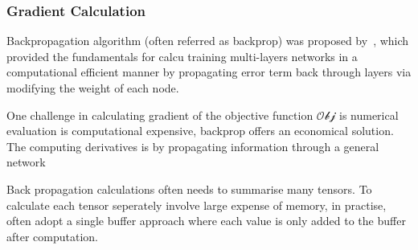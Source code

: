 \subsubsection{Gradient Calculation}
Backpropagation algorithm (often referred as backprop) was proposed by~\citet{werbos1975beyond}, which provided the fundamentals for calcu training multi-layers networks in a computational efficient manner by propagating error term back through layers via modifying the weight of each node. 
\par
One challenge in calculating gradient of the objective function $\mathcal{Obj}$ is numerical evaluation is computational expensive, backprop offers an economical solution. The computing derivatives is by propagating information through a general network 
\par 
Back propagation calculations often needs to summarise many tensors. To calculate each tensor seperately involve large expense of memory, in practise, often adopt a single buffer approach where each value is only added to the buffer after computation.